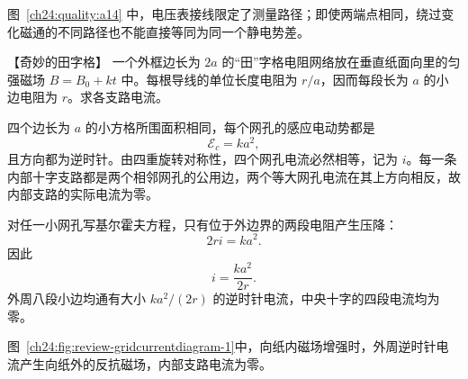 {\begin{xesolution}
图~\ref{ch24:quality:a14} 中，电压表接线限定了测量路径；即使两端点相同，绕过变化磁通的不同路径也不能直接等同为同一个静电势差。
\end{xesolution}



\begin{origexamplebox}{【奇妙的田字格】}\label{ch24:ex:s40-9-15}
一个外框边长为 $2a$ 的“田”字格电阻网络放在垂直纸面向里的匀强磁场 $B=B_0+kt$ 中。每根导线的单位长度电阻为 $r/a$，因而每段长为 $a$ 的小边电阻为 $r$。求各支路电流。

%
\begin{center}\end{center}
\end{origexamplebox}

\begin{xesolution}
四个边长为 $a$ 的小方格所围面积相同，每个网孔的感应电动势都是
\begin{equation}
  \mathcal E_c=ka^2,
\end{equation}
且方向都为逆时针。由四重旋转对称性，四个网孔电流必然相等，记为 $i$。每一条内部十字支路都是两个相邻网孔的公用边，两个等大网孔电流在其上方向相反，故内部支路的实际电流为零。

对任一小网孔写基尔霍夫方程，只有位于外边界的两段电阻产生压降：
\begin{equation}
  2ri=ka^2.
\end{equation}
因此
\begin{equation}
  \boxed{i=\frac{ka^2}{2r}}.
\end{equation}
外周八段小边均通有大小 $ka^2/(2r)$ 的逆时针电流，中央十字的四段电流均为零。

图~\ref{ch24:fig:review-gridcurrentdiagram-1}中，向纸内磁场增强时，外周逆时针电流产生向纸外的反抗磁场，内部支路电流为零。
\par\noindent\begin{minipage}{\linewidth}
\gridCurrentDiagram
{}
\end{minipage}\par\medskip
\end{xesolution}



}
